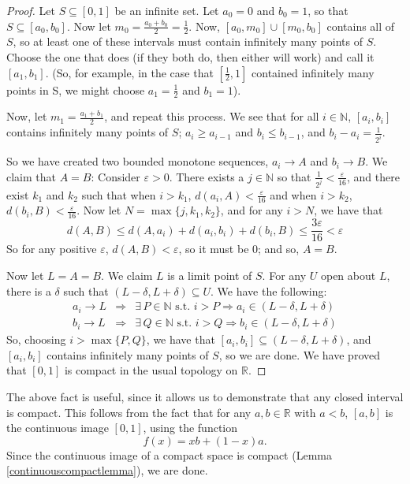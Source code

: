 \documentclass[12pt]{report}
\newcommand{\exst}{\exists\,}
\newcommand{\st}{\textrm{ s.t. }}
\newcommand{\reals}{\mathbb{R}}
\newcommand{\naturals}{\mathbb{N}}
\begin{document}
\begin{proof}
Let $S \subseteq [0,1]$ be an infinite set. Let $a_0 = 0$ and $b_0 = 1$, so
that $S \subseteq [a_0, b_0]$. Now let $m_0 = \frac{a_0 + b_0}{2} =
\frac{1}{2}$. Now, $[a_0, m_0] \cup [m_0, b_0]$ contains all of $S$, so at
least one of these intervals must contain infinitely many points of $S$.
Choose the one that does (if they both do, then either will work) and 
call it $[a_1, b_1]$.  (So, for example, in the case that  $[\frac{1}{2}, 1]$ 
contained infinitely many points in S, we might choose $a_1 = \frac{1}{2}$ and 
$b_1 = 1$). 

Now, let $m_1 = \frac{a_1 + b_1}{2}$, and repeat this process. We see that for
all $i \in \naturals$, $[a_i, b_i]$ contains infinitely many points of $S$;
$a_i \geq a_{i-1}$ and $b_i \leq b_{i-1}$, and $b_i - a_i = \frac{1}{2^i}$. 

So we have created two bounded monotone sequences, $a_i \rightarrow A$ and
$b_i \rightarrow B$. We claim that $A = B$: Consider $\varepsilon > 0$.
There exists a $j \in \naturals$ so that $\frac{1}{2^j} <
\frac{\varepsilon}{16}$, and there exist $k_1$ and $k_2$ such that when $i >
k_1$, $d(a_i, A) < \frac{\varepsilon}{16}$ and when $i > k_2$, $d(b_i, B) <
\frac{\varepsilon}{16}$. Now let $N = \max\{j, k_1, k_2\}$, and for any $i >
N$, we have that 
\begin{displaymath}
d(A,B) \leq d(A,a_i) + d(a_i, b_i) + d(b_i, B) \leq \frac{3\varepsilon}{16} <
\varepsilon
\end{displaymath}
So for any positive $\varepsilon$, $d(A,B) < \varepsilon$, so it must be 0;
and so, $A = B$.

Now let $L = A = B$. We claim $L$ is a limit point of $S$. For any $U$ open
about $L$, there is a $\delta$ such that $(L - \delta, L + \delta) 
\subseteq U$. We have the following: 
\begin{eqnarray*}
a_i \rightarrow L & \Rightarrow & \exst P \in \naturals \st i > P \Rightarrow
a_i \in (L - \delta, L + \delta) \\
b_i \rightarrow L & \Rightarrow & \exst Q \in \naturals \st i > Q \Rightarrow
b_i \in (L - \delta, L + \delta)
\end{eqnarray*}
So, choosing $i > \max\{P,Q\}$, we have that $[a_i,b_i] \subseteq (L - \delta,
L + \delta)$, and $[a_i, b_i]$ contains infinitely many points of $S$, so we
are done. We have proved that $[0,1]$ is compact in the usual topology on
$\reals$.
\end{proof}

The above fact is useful, since it allows us to demonstrate that any 
closed interval is compact. This follows from the fact that for any 
$a,b \in \reals$ with $a < b$, $[a,b]$ is the continuous image $[0,1]$, using
the function
\begin{displaymath}
f(x) = xb + (1-x)a.
\end{displaymath}
Since the continuous image of a compact space is compact (Lemma 
\ref{continuouscompactlemma}), we are done.
\end{document}
